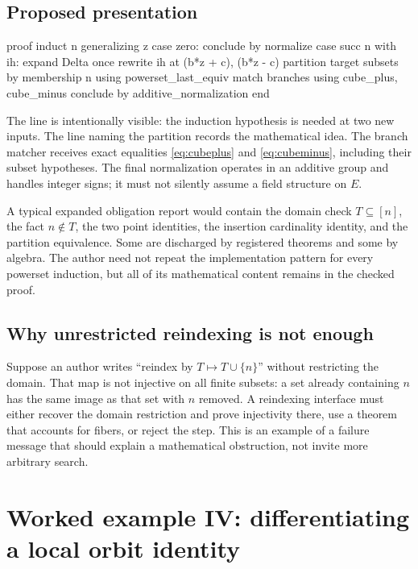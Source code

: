 \documentclass[11pt,a4paper]{article}
\newcommand{\code}[1]{\texttt{\detokenize{#1}}}
\theoremstyle{remark}
\begin{document}
\subsection{Proposed presentation}

\begin{Code}
proof
  induct n generalizing z
  case zero: conclude by normalize
  case succ n with ih:
    expand Delta once
    rewrite ih at (b*z + c), (b*z - c)
    partition target subsets by membership n
      using powerset_last_equiv
    match branches using cube_plus, cube_minus
    conclude by additive_normalization
end
\end{Code}
The line \code{generalizing z} is intentionally visible: the induction hypothesis is needed at two new inputs. The line naming the partition records the mathematical idea. The branch matcher receives exact equalities \eqref{eq:cubeplus} and \eqref{eq:cubeminus}, including their subset hypotheses. The final normalization operates in an additive group and handles integer signs; it must not silently assume a field structure on \(E\).

A typical expanded obligation report would contain the domain check \(T\subseteq[n]\), the fact \(n\notin T\), the two point identities, the insertion cardinality identity, and the partition equivalence. Some are discharged by registered theorems and some by algebra. The author need not repeat the implementation pattern for every powerset induction, but all of its mathematical content remains in the checked proof.

\subsection{Why unrestricted reindexing is not enough}

Suppose an author writes ``reindex by \(T\mapsto T\cup\{n\}\)'' without restricting the domain. That map is not injective on all finite subsets: a set already containing \(n\) has the same image as that set with \(n\) removed. A reindexing interface must either recover the domain restriction and prove injectivity there, use a theorem that accounts for fibers, or reject the step. This is an example of a failure message that should explain a mathematical obstruction, not invite more arbitrary search.

\section{Worked example IV: differentiating a local orbit identity}\label{sec:derivative}
\end{document}
